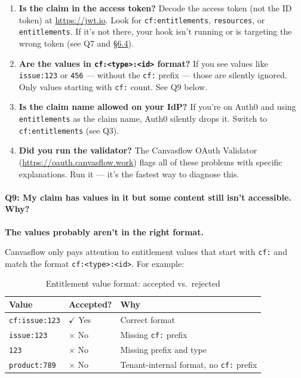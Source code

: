 \begin{enumerate}
  \item \textbf{Is the claim in the access token?} Decode the access token (not the ID
    token) at \url{https://jwt.io}. Look for \texttt{cf:entitlements},
    \texttt{resources}, or \texttt{entitlements}. If it's not there, your hook isn't
    running or is targeting the wrong token (see Q7 and \hyperref[sec:hook-rules]{\S6.4}).

  \item \textbf{Are the values in \texttt{cf:<type>:<id>} format?} If you see values
    like \texttt{issue:123} or \texttt{456} --- without the \texttt{cf:} prefix --- those
    are silently ignored. Only values starting with \texttt{cf:} count. See Q9 below.

  \item \textbf{Is the claim name allowed on your IdP?} If you're on Auth0 and using
    \texttt{entitlements} as the claim name, Auth0 silently drops it. Switch to
    \texttt{cf:entitlements} (see Q3).

  \item \textbf{Did you run the validator?} The Canvasflow OAuth Validator
    (\url{https://oauth.canvasflow.work}) flags all of these problems with specific
    explanations. Run it --- it's the fastest way to diagnose this.
\end{enumerate}

\paragraph{Q9: My claim has values in it but some content still isn't accessible. Why?}

\textbf{The values probably aren't in the right format.}

Canvasflow only pays attention to entitlement values that start with \texttt{cf:} and
match the format \texttt{cf:<type>:<id>}. For example:

\begin{table}[htbp]
\centering
\begin{tabular}{@{}llp{7cm}@{}}
\toprule
\textbf{Value} & \textbf{Accepted?} & \textbf{Why} \\
\midrule
\texttt{cf:issue:123} & $\checkmark$ Yes & Correct format \\
\texttt{issue:123}    & $\times$ No      & Missing \texttt{cf:} prefix \\
\texttt{123}          & $\times$ No      & Missing prefix and type \\
\texttt{product:789}  & $\times$ No      & Tenant-internal format, no \texttt{cf:} prefix \\
\bottomrule
\end{tabular}
\caption{Entitlement value format: accepted vs.\ rejected}
\end{table}

